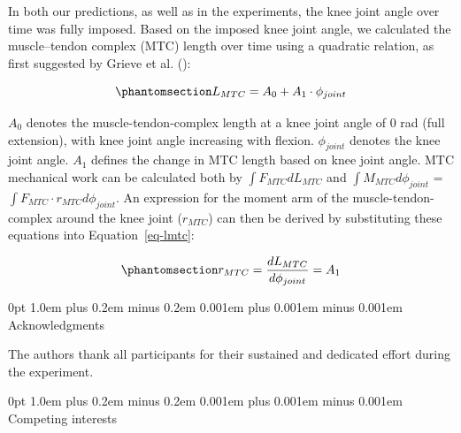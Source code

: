 \documentclass[
  11pt,
  a4paper]{article}
\makeatletter
\renewcommand{\section}{%
  \@startsection{section}{1}
    {0pt} 					%
    {1.0em plus 0.2em minus 0.2em} 	%
    {0.001em plus 0.001em minus 0.001em}    	%
    {\Large\bfseries\sffamily}%
}
\makeatother
\begin{document}
In both our predictions, as well as in the experiments, the knee joint
angle over time was fully imposed. Based on the imposed knee joint
angle, we calculated the muscle--tendon complex (MTC) length over time
using a quadratic relation, as first suggested by Grieve et al.
():

\begin{equation}\protect\phantomsection\label{eq-lmtc}{
L_{MTC} = A_0 + A_1 \cdot \phi_{joint}
}\end{equation}

\(A_0\) denotes the muscle-tendon-complex length at a knee joint angle
of 0 rad (full extension), with knee joint angle increasing with
flexion. \(\phi_{joint}\) denotes the knee joint angle. \(A_1\) defines
the change in MTC length based on knee joint angle. MTC mechanical work
can be calculated both by \(\int F_{MTC} dL_{MTC}\) and
\(\int M_{MTC} d\phi_{joint}\) =
\(\int F_{MTC} \cdot r_{MTC} d\phi_{joint}\). An expression for the
moment arm of the muscle-tendon-complex around the knee joint
(\(r_{MTC}\)) can then be derived by substituting these equations into
Equation~\ref{eq-lmtc}:

\begin{equation}\protect\phantomsection\label{eq-rmtc}{
r_{MTC} = \frac{dL_{MTC}}{d\phi_{joint}} = A_1
}\end{equation}

\begin{appapptblfig}

\centering{



}

\caption{\label{apptbl-parms}Key muscle parameter values.}

\end{appapptblfig}%

\newpage{}


\section{Acknowledgments}\label{acknowledgments}

The authors thank all participants for their sustained and dedicated
effort during the experiment.


\section{Competing interests}\label{competing-interests}
\end{document}
